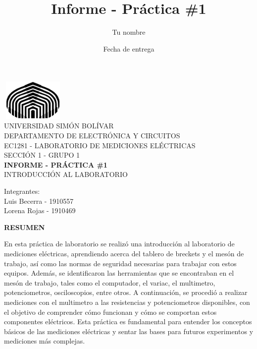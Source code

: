 \documentclass[12pt]{article}
\title{Informe - Práctica \#1}
\author{Tu nombre}
\date{Fecha de entrega}
\begin{document}
	\thispagestyle{empty}
	
	\begin{center}
		\includegraphics[width=3.1cm,height=2cm]{logo}\\
		UNIVERSIDAD SIMÓN BOLÍVAR\\
		DEPARTAMENTO DE ELECTRÓNICA Y CIRCUITOS\\
		EC1281 - LABORATORIO DE MEDICIONES ELÉCTRICAS\\
		SECCIÓN 1 - GRUPO 1\\
		
		\vspace{7cm}
		\textbf{\Large INFORME - PRÁCTICA \#1}\\
		INTRODUCCIÓN AL LABORATORIO\\
	\end{center}

	\begin{flushleft}
		\vspace{9cm}
		\hfill Integrantes:\\
		\hfill {\large Luis Becerra - 1910557}\\
		\hfill {\large Lorena Rojas - 1910469}\\
	\end{flushleft}

	\newpage
	
	
	\begin{center}
		\textbf{\large RESUMEN}\\
	\end{center}
	
	En esta práctica de laboratorio se realizó una introducción al laboratorio de mediciones eléctricas, aprendiendo acerca del tablero de breckets y el mesón de trabajo, así como las normas de seguridad necesarias para trabajar con estos equipos. Además, se identificaron las herramientas que se encontraban en el mesón de trabajo, tales como el computador, el variac, el multimetro, potenciometros, osciloscopios, entre otros. A continuación, se procedió a realizar mediciones con el multimetro a las resistencias y potenciometros disponibles, con el objetivo de comprender cómo funcionan y cómo se comportan estos componentes eléctricos. Esta práctica es fundamental para entender los conceptos básicos de las mediciones eléctricas y sentar las bases para futuros experimentos y mediciones más complejas.
	
\end{document}
